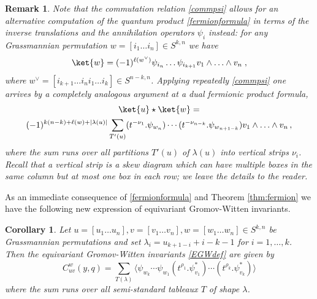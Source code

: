 \documentclass[12pt]{amsart}
\newtheorem{remark}{Remark}[section]
\newtheorem{cor}[prop]{Corollary}
\numberwithin{equation}{section}
\numberwithin{figure}{section}
\begin{document}
\begin{remark}\rm
Note that the commutation relation \eqref{commpsi} allows for an alternative computation of the quantum product \eqref{fermionformula} in terms of the inverse translations and the annihilation operators $\psi_i$ instead: for any Grassmannian permutation $w=[i_1\ldots i_n]\in S^{k,n}$ we have
\[
\ket{w}=(-1)^{\ell(w^\vee)}\psi_{i_n}\ldots\psi_{i_{k+1}}v_1\wedge\ldots\wedge v_n\;,
\]
where $w^\vee=[i_{k+1}\ldots i_ni_1\ldots i_k]\in S^{n-k,n}$. Applying repeatedly \eqref{commpsi} one arrives by a completely analogous argument at a dual fermionic product formula,
\begin{multline}
    \label{fermionformula2}
        \ket{u} \star \ket{w} =\\
        (-1)^{k(n-k)+\ell(w)+|\lambda(u)|} \sum\limits_{T'(u)} (t^{-\nu_1}.\psi_{w_n}) \cdots (t^{-\nu_{n-k}}.\psi_{w_{n+1-k}})v_1\wedge\ldots\wedge v_n\,, 
    \end{multline}
where the sum runs over all partitions $T'(u)$ of $\lambda(u)$ into vertical strips $\nu_i$. Recall that a vertical strip is a skew diagram which can have multiple boxes in the same column but at most one box in each row; we leave the details to the reader.    
\end{remark}
As an immediate consequence of \eqref{fermionformula} and Theorem \ref{thm:fermion} we have the following new expression of equivariant Gromov-Witten invariants.
\begin{cor}
Let $u=[u_1\ldots u_n],v=[v_1\ldots v_n],w=[w_1\ldots w_n]\in S^{k,n}$ be Grassmannian permutations and set $\lambda_i=u_{k+1-i}+i-k-1$ for $i=1,\ldots,k$. Then the equivariant Gromov-Witten invariants \eqref{EGWdef} are given by
\begin{equation}\label{EGW=VEV}
C_{uv}^{w}(y,q)=\sum_{T(\lambda)}
\langle\psi_{w_k}\cdots\psi_{w_1}(t^{\rho_1}.\psi^{*}_{v_1}) \cdots(t^{\rho_k}.\psi^*_{v_k})\rangle
\end{equation}
where the sum runs over all semi-standard tableaux $T$ of shape $\lambda$.
\end{cor}
\end{document}
